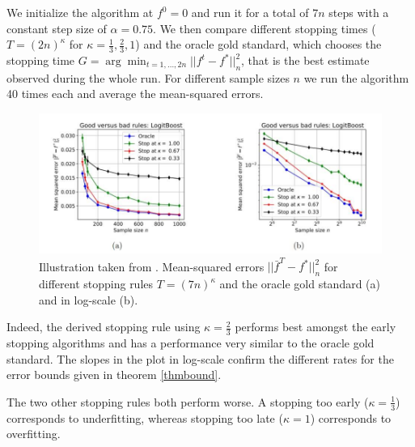 We initialize the algorithm at $f^0=0$ and run it for a total of $7n$ steps with a constant step size of $\alpha=0.75$. We then compare different stopping times ($T=(2n)^{\kappa}$ for $\kappa=\frac{1}{3},\frac{2}{3},1$) and the oracle gold standard, which chooses the stopping time $G=\operatorname{arg}\min_{t=1,\dots,2n}||f^t-f^*||_n^2$, that is the best estimate observed during the whole run. For different sample sizes $n$ we run the algorithm 40 times each and average the mean-squared errors.

\begin{figure}
  \includegraphics[width=\textwidth]{img/early_stopping_logit_plot.jpg}
  \caption{Illustration taken from \cite{wain17ada}. Mean-squared errors $||\bar{f}^T-f^*||_n^2$ for different stopping rules $T=(7n)^{\kappa}$ and the oracle gold standard (a) and in log-scale (b).}
  \label{l2boost}
\end{figure}

Indeed, the derived stopping rule using $\kappa=\frac{2}{3}$ performs best amongst the early stopping algorithms and has a performance very similar to the oracle gold standard. The slopes in the plot in log-scale confirm the different rates for the error bounds given in theorem \ref{thmbound}.

The two other stopping rules both perform worse. A stopping too early ($\kappa=\frac{1}{3}$) corresponds to underfitting, whereas stopping too late ($\kappa=1$) corresponds to overfitting.

